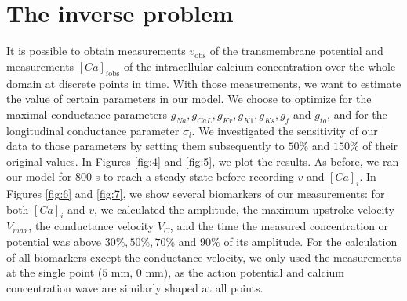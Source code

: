 \documentclass[12pt,a4paper]{article}
\begin{document}
\section{The inverse problem} \label{The inverse problem}
It is possible to obtain measurements $v_{\text{obs}}$ of the transmembrane potential and measurements $[Ca]_{i\text{obs}}$ of the intracellular calcium concentration over the whole domain at discrete points in time. With those measurements, we want to estimate the value of certain parameters in our model. We choose to optimize for the maximal conductance parameters $g_{Na}, g_{CaL}, g_{Kr}, g_{K1}, g_{Ks}, g_{f}$ and $g_{to}$, and for the longitudinal conductance parameter $\sigma_l$. We investigated the sensitivity of our data to those parameters by setting them subsequently to $50\%$ and $150\%$ of their original values. In Figures \ref{fig:4} and \ref{fig:5}, we plot the results. As before, we ran our model for 800 s to reach a steady state before recording $v$ and $[Ca]_i$.
In Figures \ref{fig:6} and \ref{fig:7}, we show several biomarkers of our measurements: for both $[Ca]_i$ and $v$, we calculated the amplitude, the maximum upstroke velocity $V_{max}$, the conductance velocity $V_{C}$, and the time the measured concentration or potential was above $30\%, 50\%, 70\%$ and $90\%$ of its amplitude. For the calculation of all biomarkers except the conductance velocity, we only used the measurements at the single point ($5$ mm, $0$ mm), as the action potential and calcium concentration wave are similarly shaped at all points.
%
\end{document}
